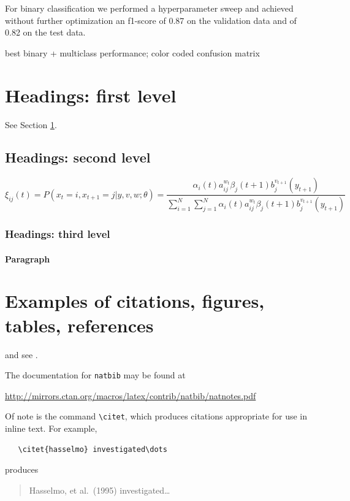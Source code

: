 \documentclass{article}
\begin{document}
For binary classification we performed a hyperparameter sweep and achieved without further optimization an f1-score of 0.87 on the 
validation data and of 0.82 on the test data.

best binary + multiclass performance;
color coded confusion matrix

\pagebreak
\section{Headings: first level}
\label{sec:headings}

\lipsum[4] See Section \ref{sec:headings}.

\subsection{Headings: second level}
\lipsum[5]
\begin{equation}
\xi _{ij}(t)=P(x_{t}=i,x_{t+1}=j|y,v,w;\theta)= {\frac {\alpha _{i}(t)a^{w_t}_{ij}\beta _{j}(t+1)b^{v_{t+1}}_{j}(y_{t+1})}{\sum _{i=1}^{N} \sum _{j=1}^{N} \alpha _{i}(t)a^{w_t}_{ij}\beta _{j}(t+1)b^{v_{t+1}}_{j}(y_{t+1})}}
\end{equation}

\subsubsection{Headings: third level}
\lipsum[6]

\paragraph{Paragraph}
\lipsum[7]

\section{Examples of citations, figures, tables, references}
\label{sec:others}
\lipsum[8] \cite{kour2014real,kour2014fast} and see \cite{hadash2018estimate}.

The documentation for \verb+natbib+ may be found at
\begin{center}
  \url{http://mirrors.ctan.org/macros/latex/contrib/natbib/natnotes.pdf}
\end{center}
Of note is the command \verb+\citet+, which produces citations
appropriate for use in inline text.  For example,
\begin{verbatim}
   \citet{hasselmo} investigated\dots
\end{verbatim}
produces
\begin{quote}
  Hasselmo, et al.\ (1995) investigated\dots
\end{quote}
\end{document}
